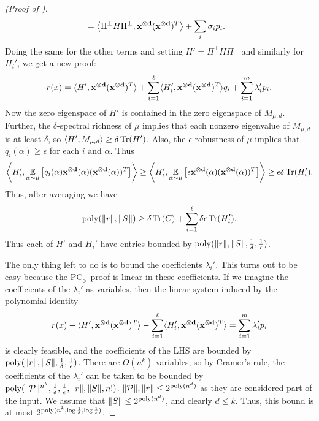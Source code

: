\begin{proof}[(Proof of )]
\begin{align*}
&= \left\langle\Pi^\perp H \Pi^\perp, \mathbf{x^{\otimes d}}(\mathbf{x^{\otimes d}})^T\right\rangle + \sum_i \sigma_i p_i.
\end{align*}
Doing the same for the other terms and setting $H' = \Pi^\perp H \Pi^\perp$ and similarly for $H_i'$, we get a new proof:
\[r(x) = \langle H', \mathbf{x^{\otimes d}}(\mathbf{x^{\otimes d}})^T\rangle + \sum_{i=1}^\ell \langle H_i', \mathbf{x^{\otimes d}}(\mathbf{x^{\otimes d}})^T\rangle q_i + \sum_{i=1}^m \lambda_i' p_i.\]
Now the zero eigenspace of $H'$ is contained in the zero eigenspace of $M_{\mu,d}$. Further, the $\delta$-spectral richness of $\mu$ implies that each nonzero eigenvalue of $M_{\mu,d}$ is at least $\delta$, so $\left\langle H',M_{\mu,d}\right\rangle \geq \delta \operatorname{Tr}(H')$. Also, the $\epsilon$-robustness of $\mu$ implies that $q_i(\alpha) \geq \epsilon$ for each $i$ and $\alpha$. Thus 
\[\left\langle H'_i, \operatorname*{\mathbb{E}}_{\alpha \sim \mu}\left[q_i(\alpha)\mathbf{x^{\otimes d}}(\alpha)(\mathbf{x^{\otimes d}}(\alpha))^T\right]\right\rangle \geq \left\langle H'_i, \operatorname*{\mathbb{E}}_{\alpha \sim \mu}\left[\epsilon\mathbf{x^{\otimes d}}(\alpha)(\mathbf{x^{\otimes d}}(\alpha))^T\right]\right\rangle \geq \epsilon \delta \operatorname{Tr}(H'_i).\]
Thus, after averaging we have 
\[\operatorname{poly}(\|r\|,\|S\|) \geq \delta \operatorname{Tr}(C) + \sum_{i=1}^\ell \delta \epsilon\operatorname{Tr}(H'_i).\]
Thus each of $H'$ and $H_i'$ have entries bounded by $\operatorname{poly}(\|r\|, \|S\|, \frac{1}{\delta}, \frac{1}{\epsilon})$.

The only thing left to do is to bound the coefficients $\lambda_i'$. This turns out to be easy because the PC$_>$ proof is linear in these coefficients. If we imagine the coefficients of the $\lambda_i'$ as variables, then the linear system induced by the polynomial identity
\[r(x) - \langle H', \mathbf{x^{\otimes d}}(\mathbf{x^{\otimes d}})^T\rangle - \sum_{i=1}^\ell \langle H_i', \mathbf{x^{\otimes d}}(\mathbf{x^{\otimes d}})^T\rangle = \sum_{i=1}^m \lambda_i' p_i\]
is clearly feasible, and the coefficients of the LHS are bounded by $\operatorname{poly}(\|r\|, \|S\|, \frac{1}{\delta}, \frac{1}{\epsilon})$. There are $O(n^k)$ variables, so by Cramer's rule, the coefficients of the $\lambda_i'$ can be taken to be bounded by $\operatorname{poly}(\|\mathcal P\|^{n^k}, \frac{1}{\delta}, \frac{1}{\epsilon}, \|r\|, \|S\|, n!)$. $\|\mathcal P\|, \|r\| \leq 2^{\operatorname{poly}(n^d)}$ as they are considered part of the input. We assume that $\|S\| \leq 2^{\operatorname{poly}(n^d)}$, and clearly $d \leq k$. Thus, this bound is at most $2^{\operatorname{poly}(n^k, \log \frac{1}{\delta}, \log \frac{1}{\epsilon})}$. 
\end{proof}


